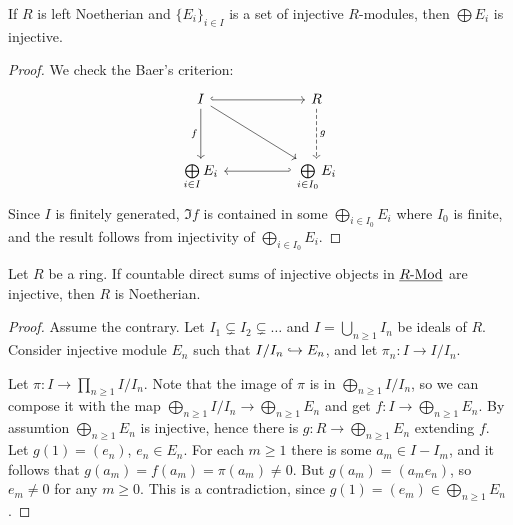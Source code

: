 \begin{proposition*}
	If \( R \) is left Noetherian and \( \{E_i\}_{i \in I} \) is a set of injective \( R \)-modules, then \( \bigoplus E_i \) is injective.
\end{proposition*}
\begin{proof}
	We check the Baer's criterion:
	\[
		\begin{tikzcd}
			I && R \\
			\\
			{\bigoplus\limits_{i \in I} E_i} && {\bigoplus\limits_{i \in I_0} E_i}
			\arrow[hook, from=1-1, to=1-3]
			\arrow["f"', from=1-1, to=3-1]
			\arrow[from=1-1, to=3-3]
			\arrow["g", dashed, from=1-3, to=3-3]
			\arrow[hook', from=3-3, to=3-1]
		\end{tikzcd}
	\]
	Since \( I \) is finitely generated, \( \Im f \) is contained in some \( \bigoplus\limits_{i \in I_0} E_i \) where \( I_0 \) is finite, and the result follows from injectivity of \( \bigoplus\limits_{i \in I_0} E_i \).
\end{proof}

\begin{theorem*}
	Let \( R \) be a ring. If countable direct sums of injective objects in \( \underline{R\text{-}\mathrm{Mod}} \)  are injective, then \( R \) is Noetherian.
\end{theorem*}
\begin{proof}
	Assume the contrary. Let \( I_1 \subsetneq I_2 \subsetneq \dotsc \) and \( I = \bigcup\limits_{n \ge 1} I_n \) be ideals of \( R \). Consider injective module \( E_n \) such that \( I/I_n \hookrightarrow E_n \), and let \( \pi_n: I \to I/I_n \).

	\vspace*{2mm}

	Let \( \pi: I \to \prod\limits_{n \geq 1} I/I_n \). Note that the image of \( \pi \) is in \( \bigoplus\limits_{n \geq 1} I/I_n \), so we can compose it with the map \( \bigoplus\limits_{n \geq 1} I/I_n \to \bigoplus\limits_{n \geq 1} E_n \) and get \( f: I \to \bigoplus\limits_{n \geq 1} E_n \). By assumtion \( \bigoplus\limits_{n \geq 1} E_n \) is injective, hence there is \( g: R \to \bigoplus\limits_{n \geq 1} E_n \) extending \( f \). Let \( g(1) = (e_n) \), \( e_n \in E_n \). For each \( m \geq 1 \) there is some \( a_m \in I \minus I_m \), and it follows that \( g(a_m) = f(a_m) = \pi(a_m) \neq 0 \). But \( g(a_m) = (a_m e_n) \), so \( e_m \neq 0 \) for any \( m \ge 0 \). This is a contradiction, since \( g(1) = (e_m) \in \bigoplus\limits_{n \ge 1} E_n \).
\end{proof}

